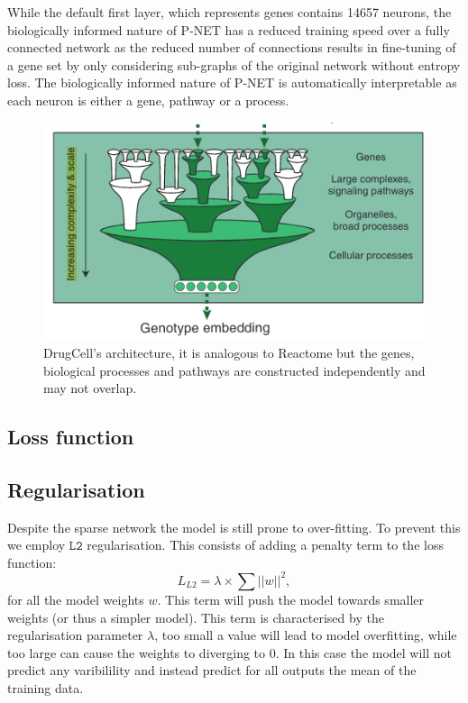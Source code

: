 \documentclass[NOTE, disdraft=true, UKenglish]{\DISCDTLATEXPATH UCLCDTDISdoc}
\begin{document}
While the default first layer, which represents genes contains 14657 neurons, the biologically informed nature of P-NET has a reduced training speed over a fully connected network as the reduced number of connections results in fine-tuning of a gene set by only considering sub-graphs of the original network without entropy loss. The biologically informed nature of P-NET is automatically interpretable as each neuron is either a gene, pathway or a process.

\begin{figure}
    \centering
    \includegraphics[width=\linewidth]{Figures/drugcell_architecture.png}
    \caption{DrugCell's \cite{kuenzi_predicting_2020} architecture, it is analogous to Reactome but the genes, biological processes and pathways are constructed independently and may not overlap.}
    \label{fig:2}
\end{figure}
\subsection{Loss function}
\subsection{Regularisation}
Despite the sparse network the model is still prone to over-fitting. To prevent this we employ $\mathtt{L2}$ regularisation. This consists of adding a penalty term to the loss function:
\begin{equation}
    L_{L2} = \lambda \times \sum ||w||^2,
\end{equation}
for all the model weights $w$. This term will push the model towards smaller weights (or thus a simpler model). This term is characterised by the regularisation parameter $\lambda$, too small a value will lead to model overfitting, while too large can cause the weights to diverging to 0. In this case the model will not predict any varibilility and instead predict for all outputs the mean of the training data.
\end{document}
